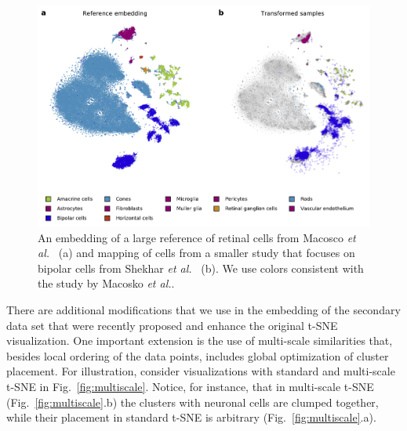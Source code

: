 \documentclass[runningheads]{llncs}
\newcommand{\etal}{\textit{et al.}}
\begin{document}
\begin{figure}[htb]
  \includegraphics[width=\textwidth]{figures/transform_retina.pdf}
  \caption{An embedding of a large reference of retinal cells from Macosco
  \etal~\cite{macosko2015} (a) and mapping of cells from a smaller study that
  focuses on bipolar cells from Shekhar \etal~\cite{shekhar2016} (b). We use
  colors consistent with the study by Macosko \etal.}
  \label{fig:transform_retina}
\end{figure}

There are additional modifications that we use in the embedding of the
secondary data set that were recently proposed and enhance the original t-SNE
visualization.  One important extension is the use of multi-scale similarities
that, besides local ordering of the data points, includes global optimization
of cluster placement. For illustration, consider visualizations with standard
and multi-scale t-SNE in Fig.~\ref{fig:multiscale}. Notice, for instance, that
in multi-scale t-SNE (Fig.~\ref{fig:multiscale}.b) the clusters with neuronal
cells are clumped together, while their placement in standard t-SNE is
arbitrary (Fig.~\ref{fig:multiscale}.a).
\end{document}
